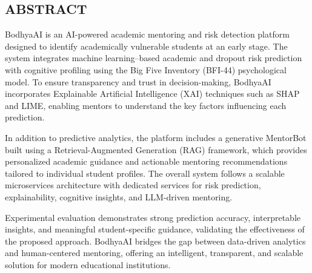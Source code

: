 \documentclass[12pt,a4paper]{report}
\begin{document}
\newpage
\thispagestyle{plain}
\begin{center}
\section*{ABSTRACT}
\end{center}

BodhyaAI is an AI-powered academic mentoring and risk detection platform designed to identify academically vulnerable students at an early stage. The system integrates machine learning–based academic and dropout risk prediction with cognitive profiling using the Big Five Inventory (BFI-44) psychological model. To ensure transparency and trust in decision-making, BodhyaAI incorporates Explainable Artificial Intelligence (XAI) techniques such as SHAP and LIME, enabling mentors to understand the key factors influencing each prediction.

In addition to predictive analytics, the platform includes a generative MentorBot built using a Retrieval-Augmented Generation (RAG) framework, which provides personalized academic guidance and actionable mentoring recommendations tailored to individual student profiles. The overall system follows a scalable microservices architecture with dedicated services for risk prediction, explainability, cognitive insights, and LLM-driven mentoring.

Experimental evaluation demonstrates strong prediction accuracy, interpretable insights, and meaningful student-specific guidance, validating the effectiveness of the proposed approach. BodhyaAI bridges the gap between data-driven analytics and human-centered mentoring, offering an intelligent, transparent, and scalable solution for modern educational institutions.
\newpage


\newpage
{}
\tableofcontents

\newpage
{}
\listoffigures

\newpage
{}
\listoftables
\newpage
\end{document}
